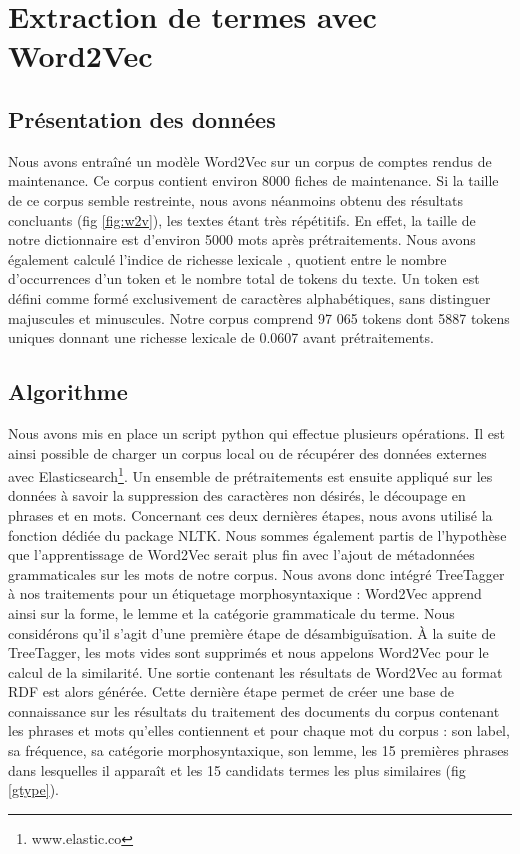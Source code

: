 \section{Extraction de termes avec Word2Vec}

\subsection{Présentation des données}
Nous avons entraîné un modèle Word2Vec sur un corpus de comptes rendus de maintenance. Ce corpus contient environ 8000 fiches de maintenance. Si la taille de ce corpus semble restreinte, nous avons néanmoins obtenu des résultats concluants (fig \ref{fig:w2v}), les textes étant très répétitifs. En effet, la taille de notre dictionnaire est d'environ 5000 mots après prétraitements. Nous avons également calculé l'indice de richesse lexicale \cite{McKee2000}, quotient entre le nombre d’occurrences d’un token et le nombre total de tokens du texte. Un token est défini comme formé exclusivement de caractères alphabétiques, sans distinguer majuscules et minuscules. Notre corpus comprend 97 065 tokens dont 5887 tokens uniques donnant une richesse lexicale de 0.0607 avant prétraitements.


\subsection{Algorithme}

Nous avons mis en place un script python qui effectue plusieurs opérations. Il est ainsi possible de charger un corpus local ou de récupérer des données externes avec Elasticsearch\footnote{www.elastic.co}.
Un ensemble de prétraitements est ensuite appliqué sur les données à savoir la suppression des caractères non désirés, le découpage en phrases et en mots. Concernant ces deux dernières étapes, nous avons utilisé la fonction dédiée du package NLTK. Nous sommes également partis de l'hypothèse que l'apprentissage de Word2Vec serait plus fin avec l'ajout de métadonnées grammaticales sur les mots de notre corpus. Nous avons donc intégré TreeTagger \cite{Schmid94probabilisticpart-of-speech} à nos traitements pour un étiquetage morphosyntaxique : Word2Vec apprend ainsi sur la forme, le lemme et la catégorie grammaticale du terme. Nous considérons qu'il s'agit d'une première étape de désambiguïsation. À la suite de TreeTagger, les mots vides sont supprimés et nous appelons Word2Vec pour le calcul de la similarité. Une sortie contenant les résultats de Word2Vec au format RDF est alors générée. Cette dernière étape permet de créer une base de connaissance sur les résultats du traitement des documents du corpus contenant les phrases et mots qu'elles contiennent et pour chaque mot du corpus : son label, sa fréquence, sa catégorie morphosyntaxique, son lemme, les 15 premières phrases dans lesquelles il apparaît et les 15 candidats termes les plus similaires (fig \ref{gtype}).
